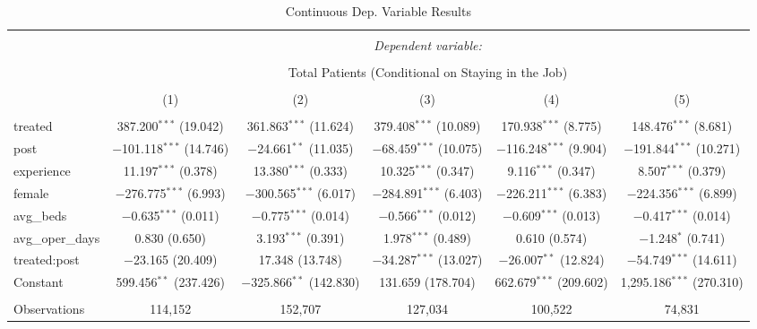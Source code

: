 
\begin{table}[!htbp] \centering 
  \caption{Continuous Dep. Variable Results} 
  \label{} 
\small 
\begin{tabular}{@{\extracolsep{3pt}}lccccc} 
\\[-1.8ex]\hline 
\hline \\[-1.8ex] 
 & \multicolumn{5}{c}{\textit{Dependent variable:}} \\ 
\cline{2-6} 
\\[-1.8ex] & \multicolumn{5}{c}{Total Patients (Conditional on Staying in the Job)} \\ 
\\[-1.8ex] & (1) & (2) & (3) & (4) & (5)\\ 
\hline \\[-1.8ex] 
 treated & 387.200$^{***}$ (19.042) & 361.863$^{***}$ (11.624) & 379.408$^{***}$ (10.089) & 170.938$^{***}$ (8.775) & 148.476$^{***}$ (8.681) \\ 
  post & $-$101.118$^{***}$ (14.746) & $-$24.661$^{**}$ (11.035) & $-$68.459$^{***}$ (10.075) & $-$116.248$^{***}$ (9.904) & $-$191.844$^{***}$ (10.271) \\ 
  experience & 11.197$^{***}$ (0.378) & 13.380$^{***}$ (0.333) & 10.325$^{***}$ (0.347) & 9.116$^{***}$ (0.347) & 8.507$^{***}$ (0.379) \\ 
  female & $-$276.775$^{***}$ (6.993) & $-$300.565$^{***}$ (6.017) & $-$284.891$^{***}$ (6.403) & $-$226.211$^{***}$ (6.383) & $-$224.356$^{***}$ (6.899) \\ 
  avg\_beds & $-$0.635$^{***}$ (0.011) & $-$0.775$^{***}$ (0.014) & $-$0.566$^{***}$ (0.012) & $-$0.609$^{***}$ (0.013) & $-$0.417$^{***}$ (0.014) \\ 
  avg\_oper\_days & 0.830 (0.650) & 3.193$^{***}$ (0.391) & 1.978$^{***}$ (0.489) & 0.610 (0.574) & $-$1.248$^{*}$ (0.741) \\ 
  treated:post & $-$23.165 (20.409) & 17.348 (13.748) & $-$34.287$^{***}$ (13.027) & $-$26.007$^{**}$ (12.824) & $-$54.749$^{***}$ (14.611) \\ 
  Constant & 599.456$^{**}$ (237.426) & $-$325.866$^{**}$ (142.830) & 131.659 (178.704) & 662.679$^{***}$ (209.602) & 1,295.186$^{***}$ (270.310) \\ 
 \hline \\[-1.8ex] 
Observations & 114,152 & 152,707 & 127,034 & 100,522 & 74,831 \\ 

\end{tabular}
\end{table}
